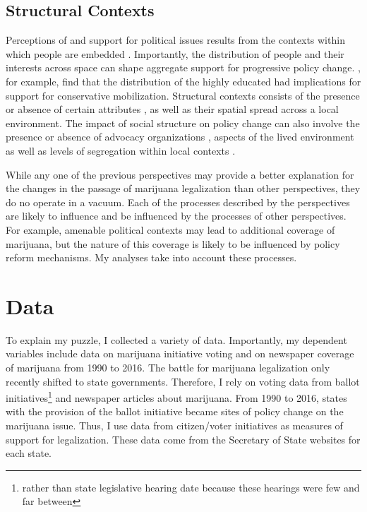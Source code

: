 \subsection{Structural Contexts}

Perceptions of and support for political issues results from the contexts within which people are embedded \citep{blau_1977a,blau_1977b,mcveigh_and_diaz_2009}. Importantly, the distribution of people and their interests across space can shape aggregate support for progressive policy change. \citet{mcveigh_et_al_2014a}, for example, find that the distribution of the highly educated had implications for support for conservative mobilization. Structural contexts consists of the presence or absence of certain attributes \citep{blau_1977a,blau_1977b,blau_and_duncan_1967}, as well as their spatial spread across a local environment. The impact of social structure on policy change can also involve the presence or absence of advocacy organizations \citep{vann_jr_2018,soule_and_olzak_2004}, aspects of the lived environment \citep{olzak_and_soule_2009} as well as levels of segregation within local contexts \citep{andrews_and_seguin_2015,olzak_et_al_1994}. 







While any one of the previous perspectives may provide a better explanation for the changes in the passage of marijuana legalization than other perspectives, they do no operate in a vacuum. Each of the processes described by the perspectives are likely to influence and be influenced by the processes of other perspectives. For example, amenable political contexts may lead to additional coverage of marijuana, but the nature of this coverage is likely to be influenced by policy reform mechanisms. My analyses take into account these processes.


\section{Data}


To explain my puzzle, I collected a variety of data. Importantly, my dependent variables include data on marijuana initiative voting and on newspaper coverage of marijuana from 1990 to 2016. The battle for marijuana legalization only recently shifted to state governments. Therefore, I rely on voting data from ballot initiatives\footnote{rather than state legislative hearing date because these hearings were few and far between} and newspaper articles about marijuana. From 1990 to 2016, states with the provision of the ballot initiative became sites of policy change on the marijuana issue. Thus, I use data from citizen/voter initiatives as measures of support for legalization. These data come from the Secretary of State websites for each state. 

